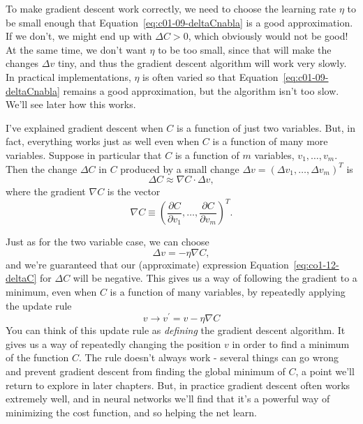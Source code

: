 To make gradient descent work correctly, we need to choose the learning rate $\eta$ to be small enough that Equation~\ref{eq:c01-09-deltaCnabla} is a good approximation. If we don't, we might end up with $\Delta C>0$, which obviously would not be good! At the same time, we don't want $\eta$ to be too small, since that will make the changes $\Delta v$ tiny, and thus the gradient descent algorithm will work very slowly. In practical implementations, $\eta$ is often varied so that Equation~\ref{eq:c01-09-deltaCnabla} remains a good approximation, but the algorithm isn't too slow. We'll see later how this works. 

I've explained gradient descent when $C$ is a function of just two variables. But, in fact, everything works just as well even when $C$ is a function of many more variables. Suppose in particular that $C$ is a function of $m$ variables, $v_1,\ldots,v_m$. Then the change $\Delta C$ in $C$ produced by a small change $\Delta v=\left(\Delta v_{1}, \dots, \Delta v_{m}\right)^{T}$ is 
\begin{equation}
\Delta C \approx \nabla C \cdot \Delta v,
\label{eq:co1-12-deltaC}
\end{equation}
where the gradient $\nabla C$ is the vector 
\begin{equation}
\nabla C \equiv\left(\frac{\partial C}{\partial v_{1}}, \ldots, \frac{\partial C}{\partial v_{m}}\right)^{T}.
\label{eq:c01-13-nablaC}
\end{equation}

Just as for the two variable case, we can choose 
\begin{equation}
\Delta v=-\eta \nabla C,
\label{eq:c01-14-deltaV}
\end{equation}
and we're guaranteed that our (approximate) expression Equation~\ref{eq:co1-12-deltaC} for $\Delta C$ will be negative. This gives us a way of following the gradient to a minimum, even when $C$ is a function of many variables, by repeatedly applying the update rule 
\begin{equation}
v \rightarrow v^{\prime}=v-\eta \nabla C
\label{eq:c01-15-vfromnablaC}
\end{equation}
You can think of this update rule as \textit{defining} the gradient descent algorithm. It gives us a way of repeatedly changing the position $v$ in order to find a minimum of the function $C$. The rule doesn't always work - several things can go wrong and prevent gradient descent from finding the global minimum of $C$, a point we'll return to explore in later chapters. But, in practice gradient descent often works extremely well, and in neural networks we'll find that it's a powerful way of minimizing the cost function, and so helping the net learn.

